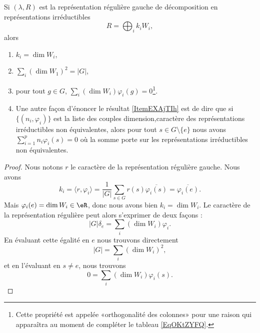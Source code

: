 \begin{proposition} \label{PropYLnxIjk}
    Si \( (\lambda,R)\) est la représentation régulière gauche de décomposition en représentations irréductibles
    \begin{equation}
        R=\bigoplus_ik_iW_i,
    \end{equation}
    alors
    \begin{enumerate}
        \item
            \( k_i=\dim W_i\),
        \item
            \( \sum_i(\dim W_1)^2=|G|\),
        \item   \label{ItemEXAjTIh}
            pour tout \( g\in G\), \( \sum_i(\dim W_i)\varphi_i(g)=0\)\footnote{Cette propriété est appelée «orthogonalité des colonnes» pour une raison qui apparaîtra au moment de compléter le tableau \eqref{EqOKtZYFQ}.}.
        \item
            Une autre façon d'énoncer le résultat \ref{ItemEXAjTIh} est de dire que si \( \{ (n_i,\varphi_i) \}\) est la liste des couples dimension,caractère des représentations irréductibles non équivalentes, alors pour tout \( s\in G\setminus\{ e \}\) nous avons \( \sum_{i=1}^pn_i\varphi_i(s)=0\) où la somme porte sur les représentations irréductibles non équivalentes.
    \end{enumerate}
\end{proposition}

\begin{proof}
    Nous notons \( r\) le caractère de la représentation régulière gauche. Nous avons
    \begin{equation}
        k_i=\langle r, \varphi_i\rangle =\frac{1}{ | G | }\sum_{s\in G}r(s)\overline{ \varphi_i(s) }=\overline{ \varphi_i(e) }.
    \end{equation}
    Mais \( \varphi_i(e)=\dim W_i\in \eR\), donc nous avons bien \( k_i=\dim W_i\). Le caractère de la représentation régulière peut alors s'exprimer de deux façons :
    \begin{equation}
        | G |\delta_e=\sum_i(\dim W_i)\varphi_i.
    \end{equation}
    En évaluant cette égalité en \( e\) nous trouvons directement
    \begin{equation}
        | G |=\sum_i(\dim W_i)^2,
    \end{equation}
    et en l'évaluant en \( s\neq e\), nous trouvons
    \begin{equation}
        0=\sum_i(\dim W_i)\varphi_i(s).
    \end{equation}
\end{proof} 

